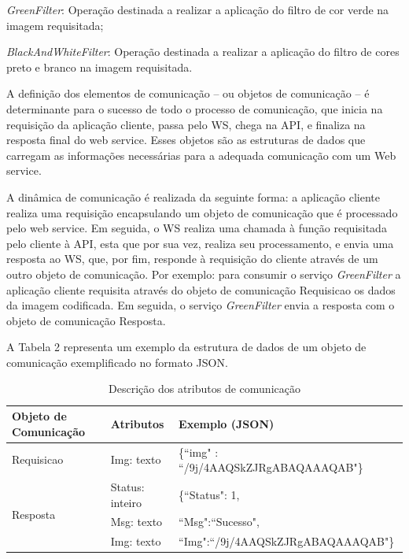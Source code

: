 \documentclass[12pt]{article}
\begin{document}

\textit{GreenFilter}: Operação destinada a realizar a aplicação do filtro de cor verde na imagem requisitada;

\textit{BlackAndWhiteFilter}: Operação destinada a realizar a aplicação do filtro de cores preto e branco na imagem requisitada.

A definição dos elementos de comunicação – ou objetos de comunicação – é
determinante para o sucesso de todo o processo de comunicação, que inicia na requisição da aplicação cliente, passa pelo WS, chega na API, e finaliza na resposta final do web service. Esses objetos são as estruturas de dados que carregam as informações necessárias para a adequada comunicação com um Web service.

A dinâmica de comunicação é realizada da seguinte forma: a aplicação cliente realiza uma requisição encapsulando um objeto de comunicação que é processado pelo web service. Em seguida, o WS realiza uma chamada à função requisitada pelo cliente à API, esta que por sua vez, realiza seu processamento, e envia uma resposta ao WS, que, por fim, responde à requisição do cliente através de um outro objeto de comunicação. Por exemplo: para consumir o serviço \textit{GreenFilter} a aplicação cliente requisita através do objeto de comunicação Requisicao os dados da imagem codificada. Em seguida, o serviço \textit{GreenFilter} envia a resposta com o objeto de comunicação Resposta.

A Tabela 2 representa um exemplo da estrutura de dados de um objeto de
comunicação exemplificado no formato JSON.

\begin{table}[ht]
	\centering
	\caption{Descrição dos atributos de comunicação}
	\label{tab:Table2}
	\smallskip
	\begin{tabular}{ |l|l|l| }
		\hline
		Objeto de Comunicação & Atributos & Exemplo (JSON) \\ \hline
		Requisicao & Img: texto & \{“img" : “/9j/4AAQSkZJRgABAQAAAQAB"\} \\ \hline
		\multirow{3}{*}{Resposta} & Status: inteiro & \{“Status": 1, \\
		& Msg: texto & “Msg":“Sucesso", \\
		& Img: texto & “Img":“/9j/4AAQSkZJRgABAQAAAQAB"\} \\
		\hline
	\end{tabular}
\end{table}
\end{document}
